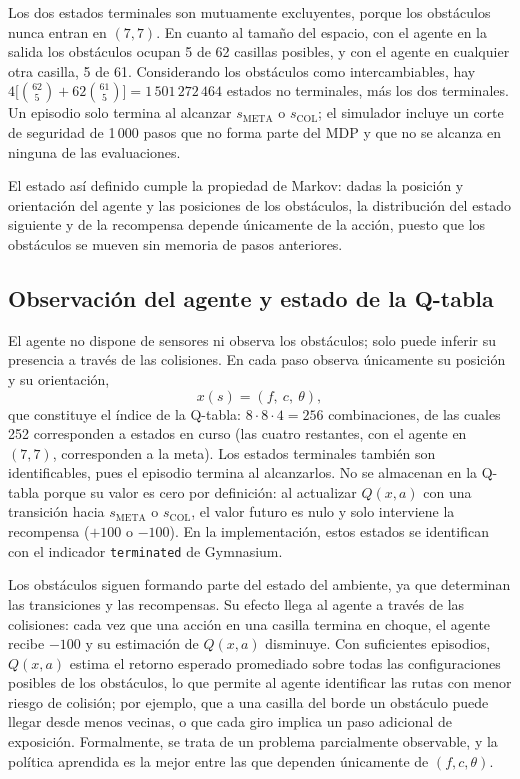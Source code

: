 \documentclass[11pt,letterpaper]{article}
\newcommand{\META}{s_{\mathrm{META}}}
\newcommand{\COL}{s_{\mathrm{COL}}}
\newcommand{\code}[1]{\texttt{#1}}
\begin{document}
Los dos estados terminales son mutuamente excluyentes, porque los obstáculos nunca entran en $(7,7)$. En cuanto
al tamaño del espacio, con el agente en la salida los obstáculos ocupan 5 de 62 casillas posibles, y con el
agente en cualquier otra casilla, 5 de 61. Considerando los obstáculos como intercambiables, hay
$4\big[\binom{62}{5}+62\binom{61}{5}\big]=1\,501\,272\,464$ estados no terminales, más los dos terminales. Un
episodio solo termina al alcanzar $\META$ o $\COL$; el simulador incluye un corte de seguridad de 1\,000 pasos
que no forma parte del MDP y que no se alcanza en ninguna de las evaluaciones.

El estado así definido cumple la propiedad de Markov: dadas la posición y orientación del agente y las
posiciones de los obstáculos, la distribución del estado siguiente y de la recompensa depende únicamente de la
acción, puesto que los obstáculos se mueven sin memoria de pasos anteriores.

\subsection{Observación del agente y estado de la Q-tabla}

El agente no dispone de sensores ni observa los obstáculos; solo puede inferir su presencia a través de las
colisiones. En cada paso observa únicamente su posición y su orientación,
\[
  x(s) = (f,\ c,\ \theta),
\]
que constituye el índice de la Q-tabla: $8\cdot8\cdot4=256$ combinaciones, de las cuales 252 corresponden a
estados en curso (las cuatro restantes, con el agente en $(7,7)$, corresponden a la meta). Los estados terminales
también son identificables, pues el episodio termina al alcanzarlos. No se almacenan en la Q-tabla porque su
valor es cero por definición: al actualizar $Q(x,a)$ con una transición hacia $\META$ o $\COL$, el valor futuro
es nulo y solo interviene la recompensa ($+100$ o $-100$). En la implementación, estos estados se identifican con
el indicador \code{terminated} de Gymnasium.

Los obstáculos siguen formando parte del estado del ambiente, ya que determinan las transiciones y las
recompensas. Su efecto llega al agente a través de las colisiones: cada vez que una acción en una casilla termina
en choque, el agente recibe $-100$ y su estimación de $Q(x,a)$ disminuye. Con suficientes episodios, $Q(x,a)$
estima el retorno esperado promediado sobre todas las configuraciones posibles de los obstáculos, lo que permite
al agente identificar las rutas con menor riesgo de colisión; por ejemplo, que a una casilla del borde un
obstáculo puede llegar desde menos vecinas, o que cada giro implica un paso adicional de exposición.
Formalmente, se trata de un problema parcialmente observable, y la política aprendida es la mejor entre las que
dependen únicamente de $(f,c,\theta)$.
\end{document}
